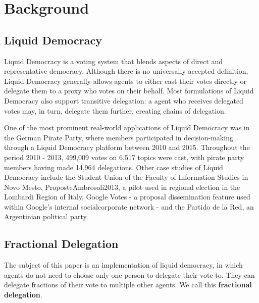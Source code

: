 \graphicspath{{./figures/}}

\chapter{Background}

\section{Liquid Democracy}

Liquid Democracy is a voting system that blends aspects of direct and representative democracy. Although there is no universally accepted definition, Liquid Democracy generally allows agents to either cast their votes directly or delegate them to a proxy who votes on their behalf. Most formulations of Liquid Democracy also support transitive delegation: a agent who receives delegated votes may, in turn, delegate them further, creating chains of delegation. \cite{degraveResolvingMultiproxyTransitive2014, boldiViscousDemocracySocial2011, revel2022liquid, bersetcheGeneralizingLiquidDemocracy2022}

One of the most prominent real-world applications of Liquid Democracy was in the German Pirate Party, where members participated in decision-making through a Liquid Democracy platform between 2010 and 2015. \cite{paulinOverviewTenYears2020} Throughout the period 2010 - 2013, 499,009 votes on 6,517 topics were cast, with pirate party members having made 14,964 delegations. \cite{klingVotingBehaviourPower2015} Other case studies of Liquid Democracy include the Student Union of the Faculty of Information Studies in Novo Mesto, ProposteAmbrosoli2013, a pilot used in regional election in the Lombardi Region of Italy, Google Votes - a proposal dissemination feature used within Google’s internal socialcorporate network - and the Partido de la Red, an Argentinian political party. \cite{paulinOverviewTenYears2020}

\section{Fractional Delegation}

The subject of this paper is an implementation of liquid democracy, in which agents do not need to choose only one person to delegate their vote to. They can delegate fractions of their vote to multiple other agents. We call this \textbf{fractional delegation}. 

